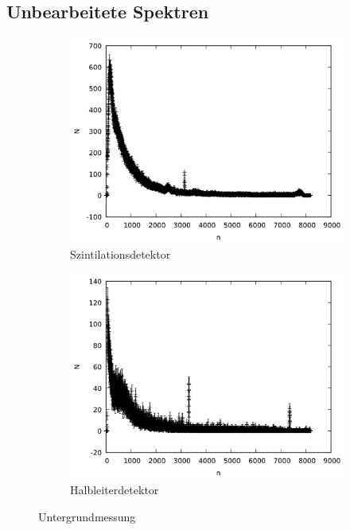 \subsection{Unbearbeitete Spektren}
\begin{figure}[h]
  \centering
  \begin{subfigure}[h]{0.5\textwidth}
    \centering
    \includegraphics[width=\textwidth]{data/si_unter.png}
    \caption{Szintilationsdetektor}
  \end{subfigure}%
  \begin{subfigure}[h]{0.5\textwidth}
    \centering
    \includegraphics[width=\textwidth]{data/ge_unter.png}
    \caption{Halbleiterdetektor}
  \end{subfigure}
  \caption{Untergrundmessung}
\end{figure}

